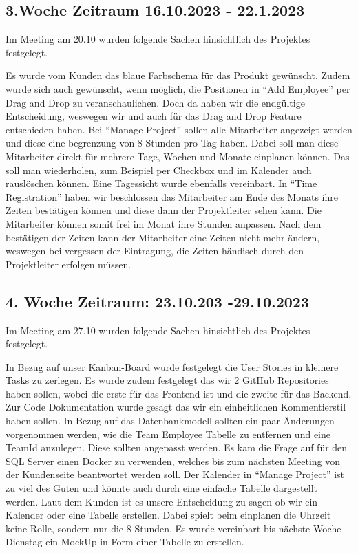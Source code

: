 \documentclass{article}
\begin{document}
    \subsection{3.Woche Zeitraum 16.10.2023 - 22.1.2023}
    Im Meeting am 20.10 wurden folgende Sachen hinsichtlich des Projektes festgelegt.
    
    Es wurde vom Kunden das blaue Farbschema für das Produkt gewünscht. Zudem wurde sich auch gewünscht, wenn möglich, die Positionen in “Add Employee” per Drag and Drop zu veranschaulichen. Doch da haben wir die endgültige Entscheidung, weswegen wir und auch für das Drag and Drop Feature entschieden haben. Bei “Manage Project” sollen alle Mitarbeiter angezeigt werden und diese eine begrenzung von 8 Stunden pro Tag haben. Dabei soll man diese Mitarbeiter direkt für mehrere Tage, Wochen und Monate einplanen können. Das soll man wiederholen, zum Beispiel per Checkbox und im Kalender auch rauslöschen können. Eine Tagessicht wurde ebenfalls vereinbart. 
    In “Time Registration” haben wir beschlossen das Mitarbeiter am Ende des Monats ihre Zeiten bestätigen können und diese dann der Projektleiter sehen kann. Die Mitarbeiter können somit frei im Monat ihre Stunden anpassen. Nach dem bestätigen der Zeiten kann der Mitarbeiter eine Zeiten nicht mehr ändern, weswegen bei vergessen der Eintragung, die Zeiten händisch durch den Projektleiter erfolgen müssen.

    \subsection{4. Woche Zeitraum: 23.10.203 -29.10.2023}
    Im Meeting am 27.10 wurden folgende Sachen hinsichtlich des Projektes festgelegt.
    
    In Bezug auf unser Kanban-Board wurde festgelegt die User Stories in kleinere Tasks zu zerlegen. Es wurde zudem festgelegt das wir 2 GitHub Repositories haben sollen, wobei die erste für das Frontend ist und die zweite für das Backend.
    Zur Code Dokumentation wurde gesagt das wir ein einheitlichen Kommentierstil haben sollen.
    In Bezug auf das Datenbankmodell sollten ein paar Änderungen vorgenommen werden, wie die Team Employee Tabelle zu entfernen und eine TeamId anzulegen. Diese sollten angepasst werden. Es kam die Frage auf für den SQL Server einen Docker zu verwenden, welches bis zum nächsten Meeting von der Kundenseite beantwortet werden soll.
    Der Kalender in “Manage Project” ist zu viel des Guten und könnte auch durch eine einfache Tabelle dargestellt werden. Laut dem Kunden ist es unsere Entscheidung zu sagen ob wir ein Kalender oder eine Tabelle erstellen. Dabei spielt beim einplanen die Uhrzeit keine Rolle, sondern nur die 8 Stunden. Es wurde vereinbart bis nächste Woche Dienstag ein MockUp in Form einer Tabelle zu erstellen.
\end{document}
